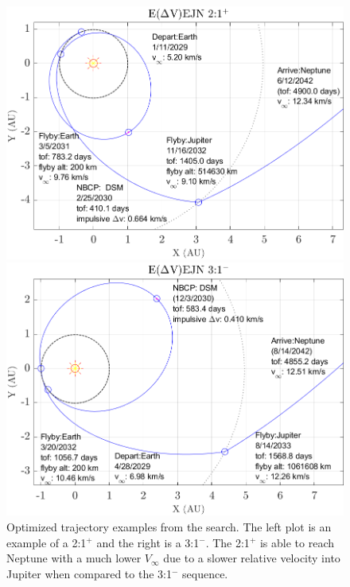 \documentclass[letterpaper, paper,11pt]{./AAS}		%
\begin{document}
%
%
\begin{figure}[ht]
		\centering
		\begin{minipage}{0.50\textwidth}
				\centering
				\includegraphics[width=1.0\textwidth]{./Figures/eejn21plus}
    \end{minipage}\hfill
		\begin{minipage}{0.50\textwidth}
				\centering
				\includegraphics[width=1.0\textwidth]{./Figures/eejn31minus}
		\end{minipage}
		\caption{Optimized trajectory examples from the search. The left plot is an example of a 2:1$^{+}$ and the right is a 3:1$^{-}$. The 2:1$^{+}$ is able to reach Neptune with a much lower $V_\infty$ due to a slower relative velocity into Jupiter when compared to the 3:1$^{-}$ sequence.}
		\label{fig:maltotriton}
\end{figure}
%
%
\end{document}
